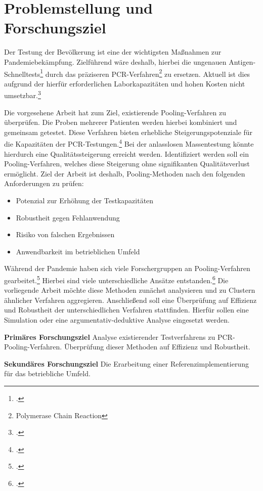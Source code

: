 
\chapter{Problemstellung und Forschungsziel}
Der Testung der Bevölkerung ist eine der wichtigsten Maßnahmen zur Pandemiebekämpfung.
Zielführend wäre deshalb, hierbei die ungenauen Antigen-Schnelltests\footcite{WuerzburgStudie}
durch das präziseren PCR-Verfahren\footnote{Polymerase Chain Reaction}
zu ersetzen.
Aktuell ist dies aufgrund der hierfür erforderlichen Laborkapazitäten und hohen Kosten nicht umsetzbar.\footcite{rki-bericht_2021}

Die vorgesehene Arbeit hat zum Ziel, existierende Pooling-Verfahren zu überprüfen.
Die Proben mehrerer Patienten werden hierbei kombiniert und gemeinsam getestet.
Diese Verfahren bieten erhebliche Steigerungspotenziale für die Kapazitäten der PCR-Testungen.\footcite{Aertzeblatt}
Bei der anlasslosen Massentestung könnte hierdurch eine Qualitätssteigerung erreicht werden.
Identifiziert werden soll ein Pooling-Verfahren, welches diese Steigerung ohne signifikanten Qualitätsverlust ermöglicht.
Ziel der Arbeit ist deshalb, Pooling-Methoden nach den folgenden Anforderungen zu prüfen:
\begin{itemize}
\setlength{\itemsep}{-8pt}
\item Potenzial zur Erhöhung der Testkapazitäten
\item Robustheit gegen Fehlanwendung
\item Risiko von falschen Ergebnissen
\item Anwendbarkeit im betrieblichen Umfeld
\end{itemize}

Während der Pandemie haben sich viele Forschergruppen an Pooling-Verfahren gearbeitet.\footcite{viehweger_increased_2020}
Hierbei sind viele unterschiedliche Ansätze entstanden.\footcite{verwilt_evaluation_2021}
Die vorliegende Arbeit möchte diese Methoden zunächst analysieren und zu Clustern ähnlicher Verfahren aggregieren.
Anschließend soll  eine Überprüfung auf Effizienz und Robustheit der unterschiedlichen Verfahren stattfinden.
Hierfür sollen eine Simulation oder eine argumentativ-deduktive Analyse eingesetzt werden.

\textbf{Primäres Forschungsziel}\newline
 Analyse existierender Testverfahrens zu PCR-Pooling-Verfahren.\newline
 Überprüfung dieser Methoden auf Effizienz und Robustheit.
 
 \textbf{Sekundäres Forschungsziel}\newline 
 Die Erarbeitung einer Referenzimplementierung für das betriebliche Umfeld.\newline
